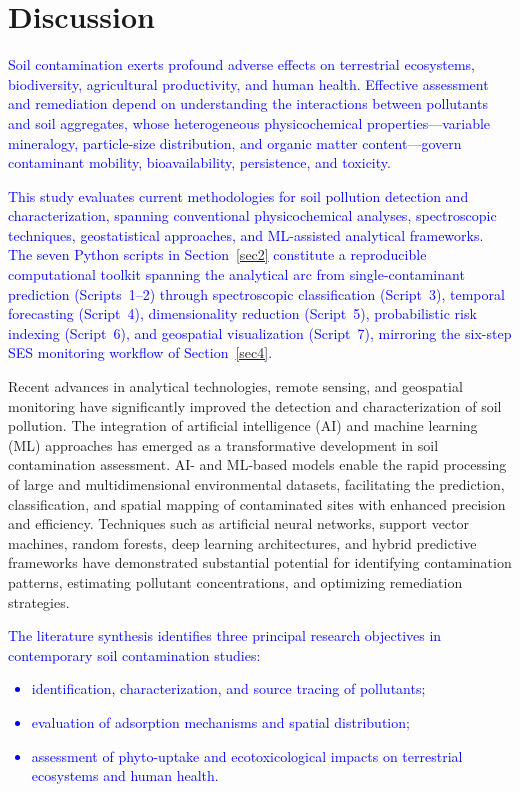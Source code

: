 \documentclass[environments,article,submit,pdftex,moreauthors]{Definitions/mdpi}
\begin{document}
\section{Discussion}\label{sec6}

\textcolor{blue}{Soil contamination exerts profound adverse effects on terrestrial ecosystems, biodiversity, agricultural productivity, and human health. Effective assessment and remediation depend on understanding the interactions between pollutants and soil aggregates, whose heterogeneous physicochemical properties---variable mineralogy, particle-size distribution, and organic matter content---govern contaminant mobility, bioavailability, persistence, and toxicity.}

\textcolor{blue}{This study evaluates current methodologies for soil pollution detection and characterization, spanning conventional physicochemical analyses, spectroscopic techniques, geostatistical approaches, and ML-assisted analytical frameworks. The seven Python scripts in Section~\ref{sec2} constitute a reproducible computational toolkit spanning the analytical arc from single-contaminant prediction (Scripts~1--2) through spectroscopic classification (Script~3), temporal forecasting (Script~4), dimensionality reduction (Script~5), probabilistic risk indexing (Script~6), and geospatial visualization (Script~7), mirroring the six-step SES monitoring workflow of Section~\ref{sec4}.}

Recent advances in analytical technologies, remote sensing, and geospatial
monitoring have significantly improved the detection and characterization of
soil pollution. The integration of artificial intelligence (AI) and machine
learning (ML) approaches has emerged as a transformative development in soil
contamination assessment. AI- and ML-based models enable the rapid processing
of large and multidimensional environmental datasets, facilitating the
prediction, classification, and spatial mapping of contaminated sites with
enhanced precision and efficiency. Techniques such as artificial neural
networks, support vector machines, random forests, deep learning architectures,
and hybrid predictive frameworks have demonstrated substantial potential for
identifying contamination patterns, estimating pollutant concentrations, and
optimizing remediation strategies.

\textcolor{blue}{The literature synthesis identifies three principal research objectives in contemporary soil contamination studies: 
\begin{itemize}
    \item identification, characterization, and source tracing
        of pollutants;
    \item evaluation of adsorption mechanisms and spatial
        distribution;
    \item assessment of phyto-uptake and ecotoxicological
        impacts on terrestrial ecosystems and human health.
\end{itemize}
}
\end{document}
